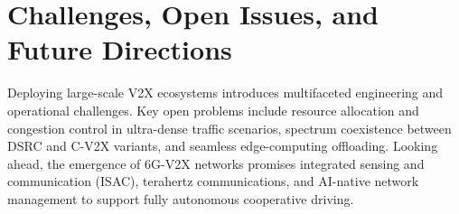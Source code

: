 \section{Challenges, Open Issues, and Future Directions}
\label{sec:challenges_future}

Deploying large-scale V2X ecosystems introduces multifaceted engineering and operational challenges.
Key open problems include resource allocation and congestion control in ultra-dense traffic scenarios, spectrum coexistence between DSRC and C-V2X variants, and seamless edge-computing offloading.
Looking ahead, the emergence of 6G-V2X networks promises integrated sensing and communication (ISAC), terahertz communications, and AI-native network management to support fully autonomous cooperative driving.

